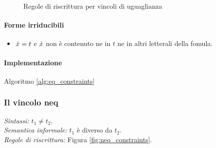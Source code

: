 \documentclass[12pt,a4paper,openright]{book} %
\begin{document}
\begin{figure}
\begin{tcolorbox}[colframe=black, colback=white, sharp corners]
	\end{tcolorbox}
	
	\caption{Regole di riscrittura per vincoli di uguaglianza}
	\label{fig:eq_constraints}
\end{figure}

\paragraph{Forme irriducibili}
\begin{itemize}
	\item $\dot{x} = t$ e $\dot{x}$ non è contenuto ne in $t$ ne in altri letterali della fomula.
\end{itemize}

\paragraph{Implementazione}
Algoritmo \ref{alg:eq_constraints}

\subsubsection{Il vincolo neq}

\textit{Sintassi:} $t_1 \neq t_2$.\\
\noindent\textit{Semantica informale:} $t_1$ è diverso da $t_2$.\\
\noindent\textit{Regole di riscrittura:} Figura \ref{fig:neq_constraints}.
\end{document}

